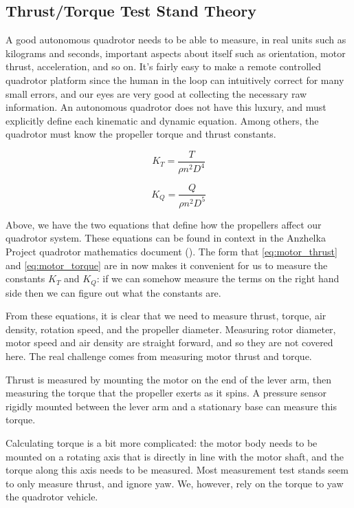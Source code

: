 \documentclass{article}
\numberwithin{equation}{section} %
\begin{document}
\subsection{Thrust/Torque Test Stand Theory}

A good autonomous quadrotor needs to be able to measure, in real units such as kilograms and seconds, important aspects about itself such as orientation, motor thrust, acceleration, and so on. It's fairly easy to make a remote controlled quadrotor platform since the human in the loop can intuitively correct for many small errors, and our eyes are very good at collecting the necessary raw information. An autonomous quadrotor does not have this luxury, and must explicitly define each kinematic and dynamic equation. Among others, the quadrotor must know the propeller torque and thrust constants. 

\begin{equation} \label{eq:motor_thrust}
K_T = \frac{T}{\rho n^2 D^4}
\end{equation}

\begin{equation} \label{eq:motor_torque}
K_Q = \frac{Q}{\rho n^2 D^5}
\end{equation}

Above, we have the two equations that define how the propellers affect our quadrotor system. These equations can be found in context in the Anzhelka Project quadrotor mathematics document (\cite{anzhelka_math}). The form that \ref{eq:motor_thrust} and \ref{eq:motor_torque} are in now makes it convenient for us to measure the constants $K_T$ and $K_Q$: if we can somehow measure the terms on the right hand side then we can figure out what the constants are.

From these equations, it is clear that we need to measure thrust, torque, air density, rotation speed, and the propeller diameter. Measuring rotor diameter, motor speed and air density are straight forward, and so they are not covered here. The real challenge comes from measuring motor thrust and torque.

Thrust is measured by mounting the motor on the end of the lever arm, then measuring the torque that the propeller exerts as it spins. A pressure sensor rigidly mounted between the lever arm and a stationary base can measure this torque.

Calculating torque is a bit more complicated: the motor body needs to be mounted on a rotating axis that is directly in line with the motor shaft, and the torque along this axis needs to be measured. Most measurement test stands seem to only measure thrust, and ignore yaw. We, however, rely on the torque to yaw the quadrotor vehicle.
\end{document}

